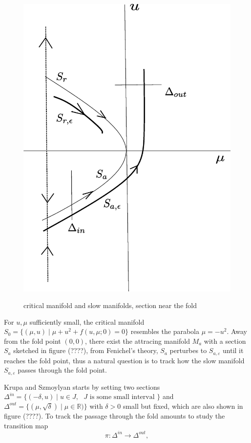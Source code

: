 \documentclass[letterpaper,11pt]{article}
\newcommand{\eps}{\varepsilon}
\numberwithin{equation}{section}
\theoremstyle{plain}
\begin{document}
\begin{figure}[ht]
 \centering %
 \scalebox{0.3} %
 {\includegraphics{pictures/passage_fold.eps}} %
 \label{fig:passage} %
 \caption{critical manifold and slow manifolds, section near the fold}
\end{figure}

For $u,\mu$ sufficiently small, the critical manifold $S_0 = \{ (\mu, u) \mid \mu + u^2 +f (u,\mu ;0) = 0\}$ resembles the parabola $\mu = - u^2$. Away from the fold point $(0,0)$, there exist the attracing manifold $M_a$ with a section $S_a$ sketched in figure (????), from Fenichel's theory, $S_a$ perturbes to $S_{a,\eps}$ until it reaches the fold point, thus a natural question is to track how the slow manifold $S_{a,\eps}$ passes through the fold point.

Krupa and Szmoylyan starts by setting two sections $\Delta^{in} = \{(-\delta, u) \mid u\in J,\text{ $J$ is some small interval }\}$ and $\Delta^{out} = \{( \mu ,\sqrt{\delta})\mid \mu \in \mathbb{R})\}$ with $\delta>0$ small but fixed, which are also shown in figure (????). To track the passage through the fold amounts to study the transition map 
\[
\pi: \Delta^{in} \to \Delta^{out},
\]
\end{document}
